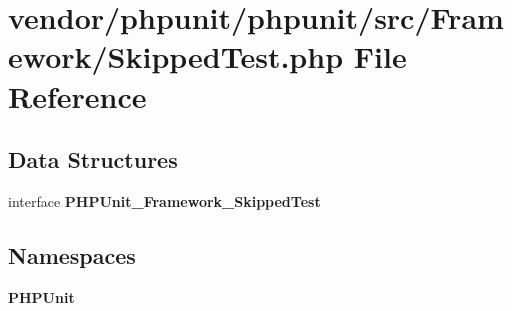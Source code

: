 \section{vendor/phpunit/phpunit/src/\+Framework/\+Skipped\+Test.php File Reference}
\label{_skipped_test_8php}
\subsection*{Data Structures}
\begin{DoxyCompactItemize}
\item 
interface {\bf P\+H\+P\+Unit\+\_\+\+Framework\+\_\+\+Skipped\+Test}
\end{DoxyCompactItemize}
\subsection*{Namespaces}
\begin{DoxyCompactItemize}
\item 
 {\bf P\+H\+P\+Unit}
\end{DoxyCompactItemize}
